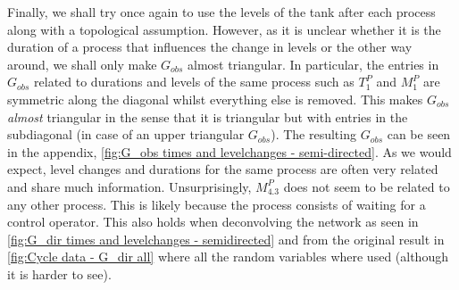 \documentclass[../Thesis.tex]{subfiles}
\begin{document}
Finally, we shall try once again to use the levels of the tank after each process along with a topological assumption. However, as it is unclear whether it is the duration of a process that influences the change in levels or the other way around, we shall only make $G_{obs}$ almost triangular. In particular, the entries in $G_{obs}$ related to durations and levels of the same process such as $T^P_1$ and $M^P_1$ are symmetric along the diagonal whilst everything else is removed. This makes $G_{obs}$ \textit{almost} triangular in the sense that it is triangular but with entries in the subdiagonal (in case of an upper triangular $G_{obs}$). The resulting $G_{obs}$ can be seen in the appendix, \autoref{fig:G_obs times and levelchanges - semi-directed}. As we would expect, level changes and durations for the same process are often very related and share much information. Unsurprisingly, $M^P_{4.3}$ does not seem to be related to any other process. This is likely because the process consists of waiting for a control operator. This also holds when deconvolving the network as seen in \autoref{fig:G_dir times and levelchanges - semidirected} and from the original result in \autoref{fig:Cycle data - G_dir all} where all the random variables where used (although it is harder to see). 
\end{document}
